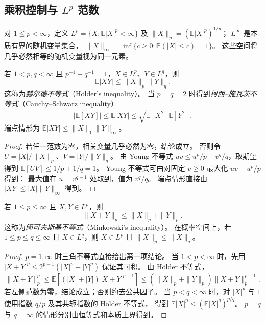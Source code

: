\documentclass[UTF8,12pt,a4paper,fontset=fandol]{ctexart}
\begin{document}
\subsection{乘积控制与 \texorpdfstring{$L^p$}{Lp} 范数}

对 $1\leq p<\infty$，定义
$L^p=\{X:\mathbb E|X|^p<\infty\}$ 及
$\|X\|_p=(\mathbb E|X|^p)^{1/p}$；
$L^\infty$ 是本质有界的随机变量集合，
$\|X\|_\infty=\inf\{c\geq0:\mathbb P(|X|\leq c)=1\}$。
这些空间将几乎必然相等的随机变量视为同一元素。

\begin{theorem}
\label{thm:expectation-holder}
若 $1<p,q<\infty$ 且 $p^{-1}+q^{-1}=1$，$X\in L^p$、$Y\in L^q$，则
\begin{equation}
  \mathbb E|XY|\leq\|X\|_p\|Y\|_q.
  \label{eq:expectation-holder}
\end{equation}
这称为\emph{赫尔德不等式}（Hölder's inequality）。
当 $p=q=2$ 时得到\emph{柯西--施瓦茨不等式}（Cauchy--Schwarz inequality）
\[
  |\mathbb E[XY]|
  \leq\mathbb E|XY|
  \leq\sqrt{\mathbb E[X^2]\mathbb E[Y^2]}.
\]
端点情形为 $\mathbb E|XY|\leq\|X\|_1\|Y\|_\infty$。
\end{theorem}

\begin{proof}
若任一范数为零，相关变量几乎必然为零，结论成立。
否则令 $U=|X|/\|X\|_p$、$V=|Y|/\|Y\|_q$。
由 Young 不等式 $uv\leq u^p/p+v^q/q$，取期望得到
$\mathbb E[UV]\leq1/p+1/q=1$。
Young 不等式可由对固定 $v\geq0$ 最大化 $uv-u^p/p$ 得到：
最大值在 $u=v^{q-1}$ 处取到，值为 $v^q/q$。
端点情形直接由 $|XY|\leq|X|\|Y\|_\infty$ 得到。
\end{proof}

\begin{proposition}
\label{prop:expectation-lp}
若 $1\leq p\leq\infty$ 且 $X,Y\in L^p$，则
\[
  \|X+Y\|_p\leq\|X\|_p+\|Y\|_p.
\]
这称为\emph{闵可夫斯基不等式}（Minkowski's inequality）。
在概率空间上，若 $1\leq p\leq q\leq\infty$ 且 $X\in L^q$，则
$X\in L^p$ 且 $\|X\|_p\leq\|X\|_q$。
\end{proposition}

\begin{proof}
$p=1,\infty$ 时三角不等式直接给出第一项结论。
当 $1<p<\infty$ 时，先用
$|X+Y|^p\leq2^{p-1}(|X|^p+|Y|^p)$ 保证其可积。
由 Hölder 不等式，
\[
  \|X+Y\|_p^p
  \leq\mathbb E[(|X|+|Y|)|X+Y|^{p-1}]
  \leq(\|X\|_p+\|Y\|_p)\|X+Y\|_p^{p-1}.
\]
若左侧范数为零，结论成立；否则约去公共因子。
当 $p<q<\infty$ 时，对 $|X|^p$ 与 $1$ 使用指数 $q/p$ 及其共轭指数的 Hölder 不等式，
得到 $\mathbb E|X|^p\leq(\mathbb E|X|^q)^{p/q}$。
$p=q$ 与 $q=\infty$ 的情形分别由恒等式和本质上界得到。
\end{proof}
\end{document}
